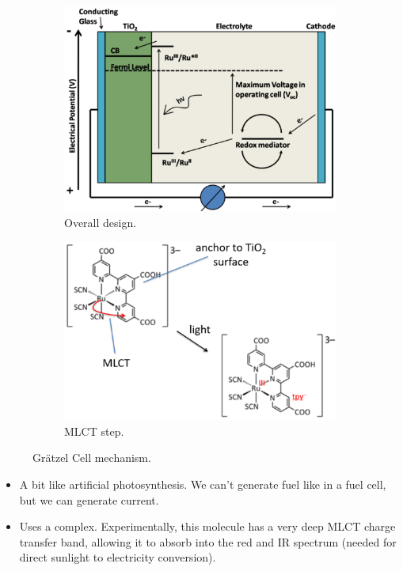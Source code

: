 \documentclass[../notes.tex]{subfiles}
\begin{document}
\begin{itemize}
\begin{figure}[h!]
\begin{subfigure}[b]{0.49\linewidth}
            \includegraphics[width=0.9\linewidth]{../ExtFiles/GratzelCella.png}
            \caption{Overall design.}
            \label{fig:GratzelCella}
        \end{subfigure}
        \begin{subfigure}[b]{0.49\linewidth}
            \centering
            \includegraphics[width=0.9\linewidth]{../ExtFiles/GratzelCellb.png}
            \caption{MLCT step.}
            \label{fig:GratzelCellb}
        \end{subfigure}
        \caption{Gr\"{a}tzel Cell mechanism.}
        \label{fig:GratzelCell}
    \end{figure}
    \begin{itemize}
        \item A bit like artificial photosynthesis. We can't generate fuel like in a fuel cell, but we can generate current.
        \item Uses a  complex. Experimentally, this molecule has a very deep MLCT charge transfer band, allowing it to absorb into the red and IR spectrum (needed for direct sunlight to electricity conversion).

\end{itemize}
\end{itemize}
\end{document}
